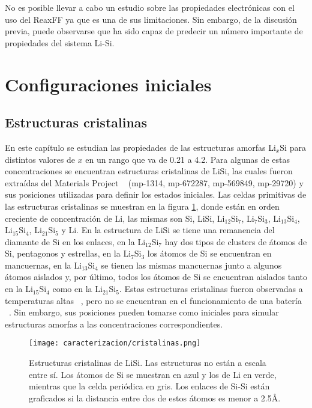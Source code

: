 No es posible llevar a cabo un estudio sobre las propiedades electrónicas con el 
uso del ReaxFF ya que es una de sus limitaciones.  Sin embargo, de la discusión 
previa, puede observarse que ha sido capaz de predecir un número importante de
propiedades del sistema Li-Si.


\section{Configuraciones iniciales}

\subsection{Estructuras cristalinas}

En este capítulo se estudian las propiedades de las estructuras amorfas Li$_x$Si
para distintos valores de $x$ en un rango que va de 0.21 a 4.2. Para algunas de
estas concentraciones se encuentran estructuras cristalinas de LiSi, las cuales 
fueron extraídas del Materials Project ~\cite{materials_project} 
(mp-1314, mp-672287, mp-569849, mp-29720) y sus posiciones utilizadas para definir
los estados iniciales. Las celdas primitivas de las estructuras cristalinas se
muestran en la figura \ref{fig:cristalinas}, donde están en orden creciente de 
concentración de Li, las mismas son Si, LiSi, Li$_{12}$Si$_7$, Li$_7$Si$_3$, 
Li$_{13}$Si$_4$, Li$_{15}$Si$_4$, Li$_{21}$Si$_5$ y Li. En la estructura de LiSi
se tiene una remanencia del diamante de Si en los enlaces, en la Li$_{12}$Si$_7$ 
hay dos tipos de clusters de átomos de Si, pentagonos y estrellas, en la
Li$_7$Si$_3$ los átomos de Si se encuentran en mancuernas, en la Li$_{13}$Si$_4$ 
se tienen las mismas mancuernas junto a algunos átomos aislados y, por último, 
todos los átomos de Si se encuentran aislados tanto en la Li$_{15}$Si$_{4}$ como
en la Li$_{21}$Si$_5$. Estas estructuras cristalinas fueron observadas a 
temperaturas altas ~\cite{wen1981}, pero no se encuentran en el funcionamiento de
una batería ~\cite{obrovac2004}. Sin embargo, sus posiciones pueden tomarse como 
iniciales para simular estructuras amorfas a las concentraciones correspondientes.
\begin{figure}[t]
    \centering
    \texttt{[image: caracterizacion/cristalinas.png]}
    \caption{Estructuras cristalinas de LiSi. Las estructuras no están a escala 
    entre sí. Los átomos de Si se muestran en azul y los de Li en verde, mientras
    que la celda periódica en gris. Los enlaces de Si-Si están graficados si la 
    distancia entre dos de estos átomos es menor a 2.5\AA.}
    \label{fig:cristalinas}
\end{figure}

